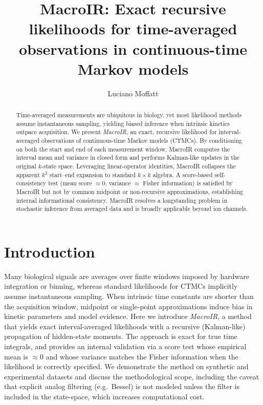\documentclass[9pt]{elife}
\title{MacroIR: Exact recursive likelihoods for time-averaged observations in continuous-time Markov models}
\author[1*]{Luciano Moffatt}
\affil[1]{Instituto de Qu\'imica F\'isica de los Materiales, Medio Ambiente y Energ\'ia (INQUIMAE), CONICET; Facultad de Ciencias Exactas y Naturales, Universidad de Buenos Aires, Ciudad de Buenos Aires, C1428EHA, Argentina}
\begin{document}
\maketitle

\begin{abstract}
Time-averaged measurements are ubiquitous in biology, yet most likelihood methods assume instantaneous sampling, yielding biased inference when intrinsic kinetics outpace acquisition. We present \emph{MacroIR}, an exact, recursive likelihood for interval-averaged observations of continuous-time Markov models (CTMCs). By conditioning on both the start and end of each measurement window, MacroIR computes the interval mean and variance in closed form and performs Kalman-like updates in the original $k$-state space. Leveraging linear-operator identities, MacroIR collapses the apparent $k^2$ start--end expansion to standard $k\times k$ algebra. A score-based self-consistency test (mean score $\approx 0$, variance $\approx$ Fisher information) is satisfied by MacroIR but not by common midpoint or non-recursive approximations, establishing internal informational consistency. MacroIR resolves a longstanding problem in stochastic inference from averaged data and is broadly applicable beyond ion channels.
\end{abstract}

\section*{Introduction}
Many biological signals are averages over finite windows imposed by hardware integration or binning, whereas standard likelihoods for CTMCs implicitly assume instantaneous sampling. When intrinsic time constants are shorter than the acquisition window, midpoint or single-point approximations induce bias in kinetic parameters and model evidence. Here we introduce \emph{MacroIR}, a method that yields exact interval-averaged likelihoods with a recursive (Kalman-like) propagation of hidden-state moments. The approach is exact for true time integrals, and provides an internal validation via a score test whose empirical mean is $\approx 0$ and whose variance matches the Fisher information when the likelihood is correctly specified. We demonstrate the method on synthetic and experimental datasets and discuss the methodological scope, including the caveat that explicit analog filtering (e.g.\ Bessel) is not modeled unless the filter is included in the state-space, which increases computational cost.
\end{document}
